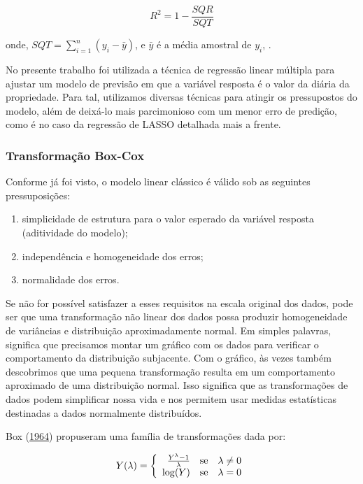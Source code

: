 \documentclass[
	12pt,				%
	a4paper,		%
	oneside,    %
	chapter=TITLE,		   %
	section=TITLE,		   %
	subsection=TITLE,	   %
	subsubsection=TITLE, %
	english,			%
	french,				%
	spanish,			%
	brazil,				%
]{abntex2}
\begin{document}
\[
R^2 = 1-\frac{SQR}{SQT}
\]

\noindent onde, \(SQT=\sum_{i=1}^n(y_i-\bar{y})\), e \(\bar{y}\) é a
média amostral de \(y_i\), .

No presente trabalho foi utilizada a técnica de regressão linear
múltipla para ajustar um modelo de previsão em que a variável resposta é
o valor da diária da propriedade. Para tal, utilizamos diversas técnicas
para atingir os pressupostos do modelo, além de deixá-lo mais
parcimonioso com um menor erro de predição, como é no caso da regressão
de LASSO detalhada mais a frente.

\hypertarget{transformauxe7uxe3o-box-cox}{%
\subsubsection{Transformação
Box-Cox}\label{transformauxe7uxe3o-box-cox}}

Conforme já foi visto, o modelo linear clássico é válido sob as
seguintes pressuposições:

\begin{enumerate}[label=(\roman*)]
\item simplicidade de estrutura para o valor esperado da variável resposta (aditividade do modelo);
\item independência e homogeneidade dos erros;
\item normalidade dos erros.
\end{enumerate}

Se não for possível satisfazer a esses requisitos na escala original dos
dados, pode ser que uma transformação não linear dos dados possa
produzir homogeneidade de variâncias e distribuição aproximadamente
normal. Em simples palavras, significa que precisamos montar um gráfico
com os dados para verificar o comportamento da distribuição subjacente.
Com o gráfico, às vezes também descobrimos que uma pequena transformação
resulta em um comportamento aproximado de uma distribuição normal. Isso
significa que as transformações de dados podem simplificar nossa vida e
nos permitem usar medidas estatísticas destinadas a dados normalmente
distribuídos.

Box (\protect\hyperlink{ref-box1964analysis}{1964}) propuseram uma
família de transformações dada por:

\[Y(\lambda)
= \left\{ \begin{array}{rll}
\frac{Y^{\lambda}-1}{\lambda} & \hbox{se} & \lambda \neq 0 \\
\log(Y) & \hbox{se} & \lambda = 0
\end{array}\right.\]
\end{document}
